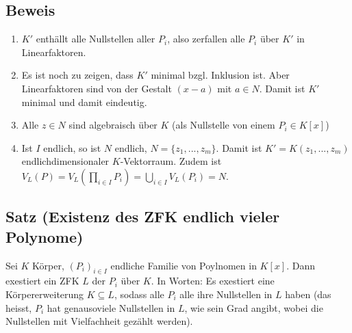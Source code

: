 \documentclass[12pt,a4paper,ngerman]{scrreprt}
\begin{document}
\subsection{Beweis}
\begin{enumerate}[(1)]
\item $K'$ enthällt alle Nullstellen aller $P_i$, also zerfallen alle $P_i$ über $K'$ in Linearfaktoren.
\item Es ist noch zu zeigen, dass $K'$ minimal bzgl. Inklusion ist. 
Aber Linearfaktoren sind von der Gestalt $(x-a)$ mit $a \in N$.
Damit ist $K'$ minimal und damit eindeutig.
\item Alle $z \in N$ sind algebraisch über $K$ (als Nullstelle von einem $P_i \in K[x]$)
\item Ist $I$ endlich, so ist $N$ endlich, $N = \{ z_1, ..., z_m\}$.
Damit ist $K' = K(z_1, ..., z_m)$ endlichdimensionaler $K$-Vektorraum.
Zudem ist $V_L(P) = V_L(\prod_{i \in I}{P_i}) = \bigcup_{i \in I} V_L(P_i) = N$.
\end{enumerate}

\subsection{Satz (Existenz des ZFK endlich vieler Polynome)}
Sei $K$ Körper, $(P_i)_{i \in I}$ endliche Familie von Poylnomen in $K[x]$.
Dann exestiert ein ZFK $L$ der $P_i$ über $K$.
In Worten: Es exestiert eine Körpererweiterung $K \subseteq L$,
sodass alle $P_i$ alle ihre Nullstellen in $L$ haben 
(das heisst, $P_i$ hat genausoviele Nullstellen in $L$, wie sein Grad angibt,
wobei die Nullstellen mit Vielfachheit gezählt werden).
\end{document}
